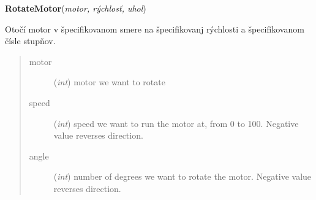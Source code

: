 \documentclass[10pt,a4paper]{article}
\begin{document}
\vspace{6pt}
{\bf RotateMotor}({\it motor, rýchlosť, uhol}) 
    
    Otočí motor v špecifikovanom smere na špecifikovanj rýchlosti a špecifikovanom čísle stupňov.




    

\begin{quote}
    \begin{description}
        
\item[motor] ({\emph{int}}) motor we want to rotate

\item[speed] ({\emph{int}}) speed we want to run the motor at, from 0 to 100. Negative value reverses direction.

\item[angle] ({\emph{int}}) number of degrees we want to rotate the motor. Negative value reverses direction.

    \end{description}
\end{quote}

 
\end{document}
